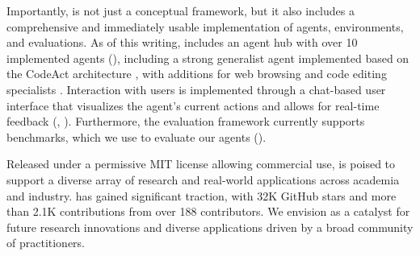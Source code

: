 Importantly, \projname is not just a conceptual framework, but it also includes a comprehensive and immediately usable implementation of agents, environments, and evaluations.
As of this writing, \projname includes an agent hub with over 10 implemented agents (), including a strong generalist agent implemented based on the CodeAct architecture \citep{wang2024executable}, with additions for web browsing \citep{browsergym} and code editing specialists \citep{yang2024sweagent}.
Interaction with users is implemented through a chat-based user interface that visualizes the agent's current actions and allows for real-time feedback (, ).
Furthermore, the evaluation framework currently supports \numbenchmarks benchmarks, which we use to evaluate our agents ().

Released under a permissive MIT license allowing commercial use,
\projname is poised to support a diverse array of research and real-world applications across academia and industry.
\projname has gained significant traction, with 32K GitHub stars and more than 2.1K contributions from over 188 contributors.
We envision \projname as a catalyst for future research innovations and diverse applications driven by a broad community of practitioners.

